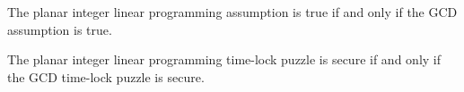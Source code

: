 \documentclass{article}
\begin{document}
\begin{conjecture}
  The planar integer linear programming assumption is true if and only if the GCD assumption is true.
\end{conjecture}

\begin{conjecture}
  The planar integer linear programming time-lock puzzle is secure if and only if the GCD time-lock puzzle is secure.
\end{conjecture}

\end{document}
